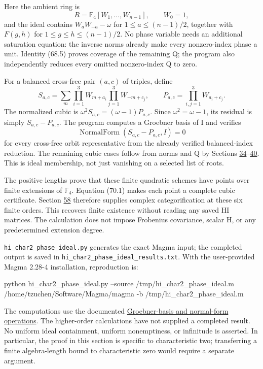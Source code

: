 \documentclass[11pt,reqno]{amsart}
\theoremstyle{plain}
\begin{document}
Here the ambient ring is
\[
 R=\mathbb F_4[W_1,\ldots,W_{n-1}],\qquad W_0=1,
\]
and the ideal contains \(W_aW_{-a}-\omega\) for
\(1\le a\le(n-1)/2\), together with
\(F(g,h)\) for \(1\le g\le h\le(n-1)/2\).
No phase variable needs an additional saturation equation: the
inverse norms already make every nonzero-index phase a unit.
Identity (68.5) proves coverage of the remaining Q; the program
also independently reduces every omitted nonzero-index Q to zero.

For a balanced cross-free pair \((a,c)\) of triples, define
\[
 S_{a,c}=\sum_m\prod_{i=1}^3W_{m+a_i}
                   \prod_{j=1}^3W_{-m+c_j},\qquad
 P_{a,c}=\prod_{i,j=1}^3W_{a_i+c_j}.
\]
The normalized cubic is
\(\omega^2 S_{a,c}=(\omega-1)P_{a,c}\).
Since \(\omega^2=\omega-1\), its residual is simply
\(S_{a,c}-P_{a,c}\). The program computes a Groebner basis of I
and verifies
\begin{equation*}
 \operatorname{NormalForm}(S_{a,c}-P_{a,c},I)=0
 \tag{70.1}
\end{equation*}
for every cross-free orbit representative from the already verified
balanced-index reduction. The remaining cubic cases follow from
norms and Q by Sections \hyperref[sec:34]{34}--\hyperref[sec:40]{40}. This is ideal membership, not just
vanishing on a selected list of roots.

The positive lengths prove that these finite quadratic schemes have
points over finite extensions of \(\mathbb F_4\). Equation (70.1)
makes each point a complete cubic certificate. Section \hyperref[sec:58]{58} therefore
supplies complex categorification at these six finite orders. This
recovers finite existence without reading any saved HI matrices.
The calculation does not impose Frobenius covariance, scalar H,
or any predetermined extension degree.

\texttt{hi\_\allowbreak char2\_\allowbreak phase\_\allowbreak ideal.py} generates the exact Magma input; the
completed output is saved in \texttt{hi\_\allowbreak char2\_\allowbreak phase\_\allowbreak ideal\_\allowbreak results.txt}.
With the user-provided Magma 2.28-4 installation, reproduction is:

\begin{code}
python hi_char2_phase_ideal.py --source /tmp/hi_char2_phase_ideal.m
/home/tzuchen/Software/Magma/magma -b /tmp/hi_char2_phase_ideal.m
\end{code}

The computations use the documented
\href{https://magma.maths.usyd.edu.au/magma/handbook/groebner_bases}{Groebner-basis and normal-form operations}.
The higher-order calculations have not supplied a completed result.
No uniform ideal containment, uniform nonemptiness, or infinitude
is asserted. In particular, the proof in this section is specific
to characteristic two; transferring a finite algebra-length bound
to characteristic zero would require a separate argument.
\end{document}
